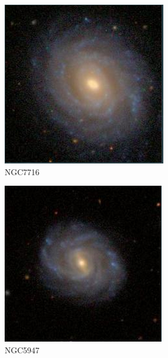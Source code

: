 \documentclass[9pt]{revtex4-1}
\begin{document}
\begin{figure}
\includegraphics[scale=0.3]{NGC7716.png}
\caption{NGC7716}
\end{figure}
\begin{figure}
\includegraphics[scale=0.3]{NGC5947.png}
\caption{NGC5947}
\end{figure}
\end{document}
